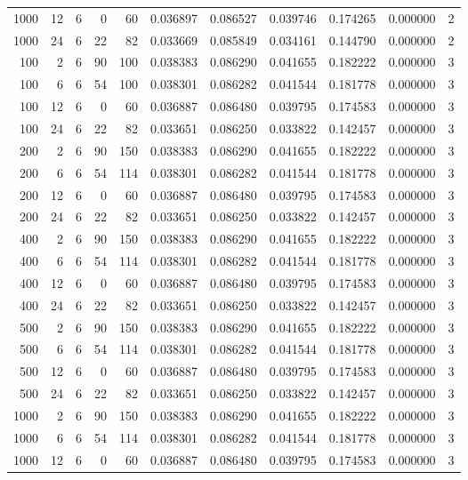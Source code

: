 \begin{table}
\begin{tabular}{rrrrrrrrrrr}
1000 & 12 & 6 & 0 & 60 & 0.036897 & 0.086527 & 0.039746 & 0.174265 & 0.000000 & 2 \\
1000 & 24 & 6 & 22 & 82 & 0.033669 & 0.085849 & 0.034161 & 0.144790 & 0.000000 & 2 \\
100 & 2 & 6 & 90 & 100 & 0.038383 & 0.086290 & 0.041655 & 0.182222 & 0.000000 & 3 \\
100 & 6 & 6 & 54 & 100 & 0.038301 & 0.086282 & 0.041544 & 0.181778 & 0.000000 & 3 \\
100 & 12 & 6 & 0 & 60 & 0.036887 & 0.086480 & 0.039795 & 0.174583 & 0.000000 & 3 \\
100 & 24 & 6 & 22 & 82 & 0.033651 & 0.086250 & 0.033822 & 0.142457 & 0.000000 & 3 \\
200 & 2 & 6 & 90 & 150 & 0.038383 & 0.086290 & 0.041655 & 0.182222 & 0.000000 & 3 \\
200 & 6 & 6 & 54 & 114 & 0.038301 & 0.086282 & 0.041544 & 0.181778 & 0.000000 & 3 \\
200 & 12 & 6 & 0 & 60 & 0.036887 & 0.086480 & 0.039795 & 0.174583 & 0.000000 & 3 \\
200 & 24 & 6 & 22 & 82 & 0.033651 & 0.086250 & 0.033822 & 0.142457 & 0.000000 & 3 \\
400 & 2 & 6 & 90 & 150 & 0.038383 & 0.086290 & 0.041655 & 0.182222 & 0.000000 & 3 \\
400 & 6 & 6 & 54 & 114 & 0.038301 & 0.086282 & 0.041544 & 0.181778 & 0.000000 & 3 \\
400 & 12 & 6 & 0 & 60 & 0.036887 & 0.086480 & 0.039795 & 0.174583 & 0.000000 & 3 \\
400 & 24 & 6 & 22 & 82 & 0.033651 & 0.086250 & 0.033822 & 0.142457 & 0.000000 & 3 \\
500 & 2 & 6 & 90 & 150 & 0.038383 & 0.086290 & 0.041655 & 0.182222 & 0.000000 & 3 \\
500 & 6 & 6 & 54 & 114 & 0.038301 & 0.086282 & 0.041544 & 0.181778 & 0.000000 & 3 \\
500 & 12 & 6 & 0 & 60 & 0.036887 & 0.086480 & 0.039795 & 0.174583 & 0.000000 & 3 \\
500 & 24 & 6 & 22 & 82 & 0.033651 & 0.086250 & 0.033822 & 0.142457 & 0.000000 & 3 \\
1000 & 2 & 6 & 90 & 150 & 0.038383 & 0.086290 & 0.041655 & 0.182222 & 0.000000 & 3 \\
1000 & 6 & 6 & 54 & 114 & 0.038301 & 0.086282 & 0.041544 & 0.181778 & 0.000000 & 3 \\
1000 & 12 & 6 & 0 & 60 & 0.036887 & 0.086480 & 0.039795 & 0.174583 & 0.000000 & 3 \\

\end{tabular}
\end{table}
